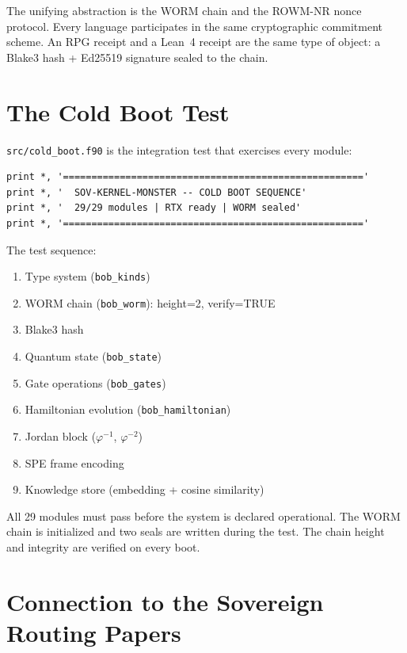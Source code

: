 \documentclass[11pt,a4paper]{article}
\begin{document}
The unifying abstraction is the WORM chain and the ROWM-NR nonce
protocol. Every language participates in the same cryptographic
commitment scheme. An RPG receipt and a Lean~4 receipt are the same
type of object: a Blake3 hash + Ed25519 signature sealed to the chain.

\section{The Cold Boot Test}

\texttt{src/cold\_boot.f90} is the integration test that exercises every
module:

\begin{lstlisting}[language={}]
print *, '====================================================='
print *, '  SOV-KERNEL-MONSTER -- COLD BOOT SEQUENCE'
print *, '  29/29 modules | RTX ready | WORM sealed'
print *, '====================================================='
\end{lstlisting}

The test sequence:
\begin{enumerate}[noitemsep]
\item Type system (\texttt{bob\_kinds})
\item WORM chain (\texttt{bob\_worm}): height=2, verify=TRUE
\item Blake3 hash
\item Quantum state (\texttt{bob\_state})
\item Gate operations (\texttt{bob\_gates})
\item Hamiltonian evolution (\texttt{bob\_hamiltonian})
\item Jordan block ($\varphi^{-1}$, $\varphi^{-2}$)
\item SPE frame encoding
\item Knowledge store (embedding + cosine similarity)
\end{enumerate}

All 29 modules must pass before the system is declared operational.
The WORM chain is initialized and two seals are written during the test.
The chain height and integrity are verified on every boot.

\section{Connection to the Sovereign Routing Papers}
\end{document}
